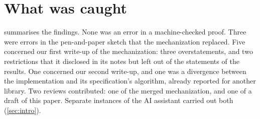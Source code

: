\section{What was caught}\label{sec:caught}

 summarises the findings. None was an error in a
machine-checked proof. Three were errors in the pen-and-paper sketch that the
mechanization replaced. Five concerned our first write-up of the
mechanization: three overstatements, and two restrictions that it disclosed
in its notes but left out of the statements of the results. One concerned our
second write-up, and one was a divergence between the implementation and its
specification's algorithm, already reported for another library. Two reviews
contributed: one of the merged mechanization, and one of a draft of this
paper. Separate instances of the AI assistant carried out both
(\cref{sec:intro}).

